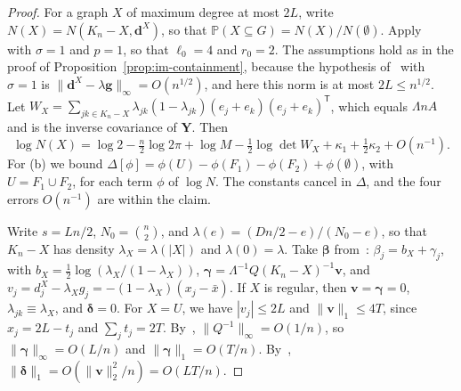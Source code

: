 \documentclass[11pt]{article}
\newcommand{\PP}{\mathbb{P}}
\begin{document}
\begin{proof}
For a graph \(X\) of maximum degree at most \(2L\), write
\(N(X)=N(K_n-X,\boldsymbol d^X)\), so that
\(\PP(X\subseteq G)=N(X)/N(\emptyset)\).
Apply~\cite[Theorem~1.2]{IM25} with \(\sigma=1\) and \(p=1\), so that
\(\ell_0=4\) and \(r_0=2\). The assumptions hold as in the proof of
Proposition~\ref{prop:im-containment}, because the hypothesis
of~\cite[Theorem~1.3]{IM25} with \(\sigma=1\) is
\(\|\boldsymbol d^X-\lambda\boldsymbol g\|_\infty=O(n^{1/2})\), and here
this norm is at most \(2L\le n^{1/2}\).
Let \(W_X=\sum_{jk\in K_n-X}\lambda_{jk}(1-\lambda_{jk})(e_j+e_k)(e_j+e_k)^{\mathsf T}\),
which equals \(\varLambda nA\) and is the inverse covariance of
\(\boldsymbol Y\). Then
\[
\log N(X)=\log2-\tfrac n2\log2\pi+\log M-\tfrac12\log\det W_X
+\kappa_1+\tfrac12\kappa_2+O(n^{-1}).
\]
For (b) we bound
\(\Delta[\phi]=\phi(U)-\phi(F_1)-\phi(F_2)+\phi(\emptyset)\), with
\(U=F_1\cup F_2\), for each term \(\phi\) of \(\log N\).
The constants cancel in \(\Delta\), and the four errors \(O(n^{-1})\) are
within the claim.

Write \(s=Ln/2\), \(N_0=\binom n2\), and
\(\lambda(e)=(Dn/2-e)/(N_0-e)\), so that \(K_n-X\) has density
\(\lambda_X=\lambda(|X|)\) and \(\lambda(0)=\lambda\).
Take \(\boldsymbol\beta\) from~\cite[Theorem~1.3]{IM25}:
\(\beta_j=b_X+\gamma_j\), with \(b_X=\frac12\log(\lambda_X/(1-\lambda_X))\),
\(\boldsymbol\gamma=\varLambda^{-1}Q(K_n-X)^{-1}\boldsymbol v\), and
\(v_j=d^X_j-\lambda_Xg_j=-(1-\lambda_X)(x_j-\bar x)\).
If \(X\) is regular, then \(\boldsymbol v=\boldsymbol\gamma=0\), \(\lambda_{jk}\equiv\lambda_X\),
and \(\boldsymbol\delta=0\).
For \(X=U\), we have \(|v_j|\le2L\) and \(\|\boldsymbol v\|_1\le4T\), since
\(x_j=2L-t_j\) and \(\sum_jt_j=2T\).
By~\cite[Theorem~A.1(a)]{IM25}, \(\|Q^{-1}\|_\infty=O(1/n)\), so
\(\|\boldsymbol\gamma\|_\infty=O(L/n)\) and \(\|\boldsymbol\gamma\|_1=O(T/n)\).
By~\cite[(1.3)]{IM25},
\(\|\boldsymbol\delta\|_1=O(\|\boldsymbol v\|_2^2/n)=O(LT/n)\).


\end{proof}
\end{document}
